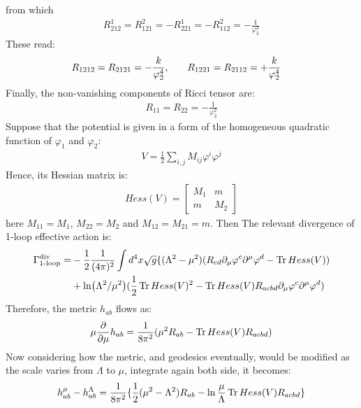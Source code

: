 from which
\begin{align}
    R_{212}^{1} = R_{121}^{2} = -R_{221}^{1} = -R_{112}^{2} = -\frac{1}{\varphi_{2} ^{2}}
\end{align}
These read:
\begin{align}
    R_{1212} = R_{2121} = -\frac{k}{\varphi_{2} ^{4}} ,& \qq{} R_{1221} = R_{2112} = +\frac{k}{\varphi_{2} ^{4}}
\end{align}
Finally, the non-vanishing components of Ricci tensor are:
\begin{align}
    R_{11} = R_{22} = -\frac{1}{\varphi_{2}^{2}}
\end{align}
Suppose that the potential is given in a form of the homogeneous quadratic function of $\varphi_{1}$ and $\varphi _{2}$:
\begin{align}
    V= \frac{1}{2} \sum_{i,j} M_{ij} \varphi^{i} \varphi^{j}
\end{align}
Hence, its Hessian matrix is:
\begin{align}
    Hess(V) = 
    \begin{bmatrix}
        M_{1} & m \\
        m & M_{2}
    \end{bmatrix}
\end{align}
here $M_{11} = M_1$, $M_{22} = M_{2}$ and $M_{12} = M_{21} = m$. Then The relevant divergence of 1-loop effective action is:
\begin{align}
    \begin{split}
        \Gamma _{\text{1-loop}}^{\text{div}} = & -\frac{1}{2} \frac{1}{(4\pi)^2} \int d^{4}x \sqrt{g} \lbrace (\Lambda ^{2} - \mu ^{2})(R_{cd} \partial _{\mu} \varphi ^{c} \partial ^{\mu} \varphi ^{d} - \Tr Hess(V)) \\
        & + \ln (\Lambda ^{2} / \mu ^{2}) (\frac{1}{2} \Tr Hess(V)^{2}  - \Tr Hess(V) R_{acbd} \partial _{\mu} \varphi ^{c} \partial ^{\mu} \varphi ^{d})
    \end{split}
\end{align}
Therefore, the metric $h_{ab}$ flows as:
\begin{align}
    \mu \pdv{\mu} h_{ab} = \frac{1}{8\pi^2} (\mu ^{2} R_{ab} - \Tr Hess(V) R_{acbd})
\end{align}
Now considering how the metric, and geodesics eventually, would be modified as the scale varies from $\Lambda$ to $\mu$, integrate again both side, it becomes:
\begin{align}
    \label{eq:2.63}
    h_{ab} ^{\mu} - h_{ab} ^{\Lambda} = \frac{1}{8\pi^{2}}\lbrace \frac{1}{2}(\mu ^{2} - \Lambda ^{2}) R_{ab} - \ln \frac{\mu}{\Lambda} \Tr Hess(V) R_{acbd} \rbrace
\end{align}
